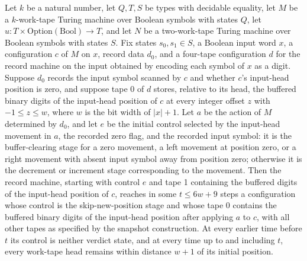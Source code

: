 \begin{theorem}
\label{Turing.recordStep_position_run}
\leanok
{}
Let $k$ be a natural number, let $Q,T,S$ be types with decidable equality, let $M$ be a
$k$-work-tape Turing machine over Boolean symbols with states $Q$, let
$u:T\times\mathrm{Option}(\mathrm{Bool})\to T$, and let $N$ be a two-work-tape Turing
machine over Boolean symbols with states $S$. Fix states $s_0,s_1\in S$, a Boolean input
word $x$, a configuration $c$ of $M$ on $x$, record data $d_0$, and a four-tape
configuration $d$ for the record machine on the input obtained by encoding each symbol
of $x$ as a digit. Suppose $d_0$ records the input symbol scanned by $c$ and whether
$c$'s input-head position is zero, and suppose tape 0 of $d$ stores, relative to its
head, the buffered binary digits of the input-head position of $c$ at every integer
offset $z$ with $-1\le z\le w$, where $w$ is the bit width of $|x|+1$. Let $a$ be the
action of $M$ determined by $d_0$, and let $e$ be the initial control selected by the
input-head movement in $a$, the recorded zero flag, and the recorded input symbol: it is
the buffer-clearing stage for a zero movement, a left movement at position zero, or a
right movement with absent input symbol away from position zero; otherwise it is the
decrement or increment stage corresponding to the movement. Then the record machine,
starting with control $e$ and tape 1 containing the buffered digits of the input-head
position of $c$, reaches in some $t\le 6w+9$ steps a configuration whose control is the
skip-new-position stage and whose tape 0 contains the buffered binary digits of the
input-head position after applying $a$ to $c$, with all other tapes as specified by the
snapshot construction. At every earlier time before $t$ its control is neither verdict
state, and at every time up to and including $t$, every work-tape head remains within
distance $w+1$ of its initial position.
\end{theorem}

